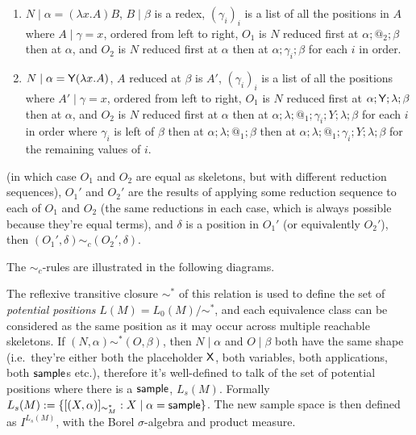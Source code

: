 \begin{definition}
\begin{enumerate}
\begin{enumerate}
        \item $N \mid \alpha = (\lambda x. A) B$, $B \mid \beta$ is a redex, $(\gamma_i)_i$ is a list of all the positions in $A$ where $A \mid \gamma = x$, ordered from left to right, $O_1$ is $N$ reduced first at $\alpha ; @_2 ; \beta$ then at $\alpha$, and $O_2$ is $N$ reduced first at $\alpha$ then at $\alpha;\gamma_i;\beta$ for each $i$ in order.
        
        \item $N \mid \alpha = \mathsf{Y} (\lambda x. A)$, $A$ reduced at $\beta$ is $A'$, $(\gamma_i)_i$ is a list of all the positions where $A' \mid \gamma  = x$, ordered from left to right, $O_1$ is $N$ reduced first at $\alpha;\mathsf{Y};\lambda;\beta$ then at $\alpha$, and $O_2$ is $N$ reduced first at $\alpha$ then at $\alpha;\lambda;@_1;\gamma_i;Y;\lambda;\beta$ for each $i$ in order where $\gamma_i$ is left of $\beta$ then at $\alpha;\lambda;@_1;\beta$ then at $\alpha;\lambda;@_1;\gamma_i;Y;\lambda;\beta$ for the remaining values of $i$.
    \end{enumerate}
    (in which case $O_1$ and $O_2$ are equal as skeletons, but with different reduction sequences), $O_1'$ and $O_2'$ are the results of applying some reduction sequence to each of $O_1$ and $O_2$ (the same reductions in each case, which is always possible because they're equal terms), and $\delta$ is a position in $O_1'$ (or equivalently $O_2'$), then $(O_1',\delta) \sim_c (O_2',\delta)$.
\end{enumerate}
The $\sim_c$-rules are illustrated in the following diagrams.
\end{definition}




The reflexive transitive closure $\sim^*$ of this relation is used to define the set of \emph{potential positions} $L(M) = L_0(M) / \sim^*$, and each equivalence class can be considered as the same position as it may occur across multiple reachable skeletons. 
If $(N,\alpha) \sim^* (O,\beta)$, then $N \mid \alpha$ and $O \mid \beta$ both have the same shape (i.e.~they're either both the placeholder $\mathsf{X}$, both variables, both applications, both $\mathsf{sample}$s etc.), therefore it's well-defined to talk of the set of potential positions where there is a $\mathsf{sample}$, $L_s(M)$. 
Formally $L_s(M) := \{[(X, \alpha)]_{\sim^\ast_M} : X \mid \alpha = \mathsf{sample}\}$.
The new sample space is then defined as $I^{L_s(M)}$, with the Borel $\sigma$-algebra and product measure.

